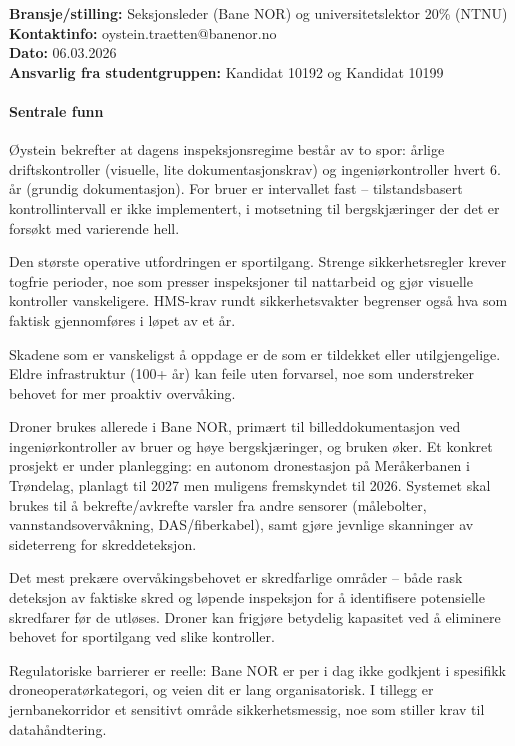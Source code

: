 \textbf{Bransje/stilling:} Seksjonsleder (Bane NOR) og universitetslektor 20\% (NTNU) \\
\textbf{Kontaktinfo:} oystein.traetten@banenor.no \\
\textbf{Dato:} 06.03.2026 \\
\textbf{Ansvarlig fra studentgruppen:} Kandidat 10192 og Kandidat 10199

\paragraph{Sentrale funn}

Øystein bekrefter at dagens inspeksjonsregime består av to spor: årlige driftskontroller (visuelle, lite dokumentasjonskrav) og ingeniørkontroller hvert 6. år (grundig dokumentasjon). For bruer er intervallet fast – tilstandsbasert kontrollintervall er ikke implementert, i motsetning til bergskjæringer der det er forsøkt med varierende hell.

Den største operative utfordringen er sportilgang. Strenge sikkerhetsregler krever togfrie perioder, noe som presser inspeksjoner til nattarbeid og gjør visuelle kontroller vanskeligere. HMS-krav rundt sikkerhetsvakter begrenser også hva som faktisk gjennomføres i løpet av et år.

Skadene som er vanskeligst å oppdage er de som er tildekket eller utilgjengelige. Eldre infrastruktur (100+ år) kan feile uten forvarsel, noe som understreker behovet for mer proaktiv overvåking.

Droner brukes allerede i Bane NOR, primært til billeddokumentasjon ved ingeniørkontroller av bruer og høye bergskjæringer, og bruken øker. Et konkret prosjekt er under planlegging: en autonom dronestasjon på Meråkerbanen i Trøndelag, planlagt til 2027 men muligens fremskyndet til 2026. Systemet skal brukes til å bekrefte/avkrefte varsler fra andre sensorer (målebolter, vannstandsovervåkning, DAS/fiberkabel), samt gjøre jevnlige skanninger av sideterreng for skreddeteksjon.

Det mest prekære overvåkingsbehovet er skredfarlige områder – både rask deteksjon av faktiske skred og løpende inspeksjon for å identifisere potensielle skredfarer før de utløses. Droner kan frigjøre betydelig kapasitet ved å eliminere behovet for sportilgang ved slike kontroller.

Regulatoriske barrierer er reelle: Bane NOR er per i dag ikke godkjent i spesifikk droneoperatørkategori, og veien dit er lang organisatorisk. I tillegg er jernbanekorridor et sensitivt område sikkerhetsmessig, noe som stiller krav til datahåndtering.

